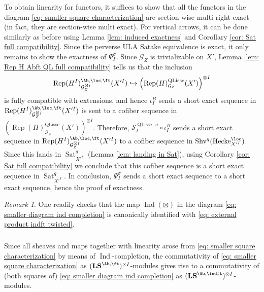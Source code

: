 \documentclass[10pt]{amsart}
\newcommand{\sssec}{\subsubsection}
\theoremstyle{remark}
\newtheorem{rmk}[subsubsection]{Remark}
\newcommand{\on}{\operatorname}
\newcommand{\cG}{\mathcal{G}}
\newcommand{\cS}{\mathcal{S}}
\newcommand{\Rep}{\on{Rep}}
\newcommand{\Shv}{\on{Shv}}
\newcommand{\QLisse}{\on{QLisse}}
\newcommand{\Sat}{\on{Sat}}
\DeclareMathOperator{\Ind}{Ind}
\newcommand{\Hecke}{\on{Hecke}}
\begin{document}
To obtain linearity for functors, it suffices to show that all the functors in the diagram \eqref{eq: smaller square characterization} are section-wise multi right-exact (in fact, they are section-wise multi exact). For vertical arrows, it can be done similarly as before using Lemma \ref{lem: induced exactness} and Corollary \ref{cor: Sat full compatibility}. Since the perverse ULA Satake equivalence is exact, it only remains to show the exactness of $\Psi^{\sigma}_I$. Since $\cG_Z$ is trivializable on $X'$, Lemma \ref{lem: Rep H Abft QL full compatibility} tells us that the inclusion
\[\Rep(H^I)^{\Ab,\loc,\ft}_{\cG^{\boxtimes I}_Z}(X'^I)\hookrightarrow \left(\Rep(H)^{\QLisse}_{\cG_Z}(X')\right)^{\otimes I}\]
is fully compatible with extensions, and hence $\iota^B_I$ sends a short exact sequence in $\Rep(H^I)^{\Ab,\loc,\ft}_{\cG^{\boxtimes I}_Z}(X'^I)$ is sent to a cofiber sequence in $\left(\Rep(H)^{\QLisse}_{\cG_Z}(X')\right)^{\otimes I}$. Therefore, $\cS^{\QLisse,\sigma}_I\circ \iota^B_I$ sends a short exact sequence in $\Rep(H^I)^{\Ab,\loc,\ft}_{\cG^{\boxtimes I}_Z}(X'^I)$ to a cofiber sequence in $\Shv^q(\Hecke^{\loc}_{X'^I})$. Since this lands in $\Sat^q_{X'^I}$ (Lemma \ref{lem: landing in Sat}), using Corollary \ref{cor: Sat full compatibility} we conclude that this cofiber sequence is a short exact sequence in $\Sat^q_{X'^I}$. In conclusion, $\Psi^{\sigma}_I$ sends a short exact sequence to a short exact sequence, hence the proof of exactness.

\begin{rmk}
    One readily checks that the map $\Ind(\boxtimes)$ in the diagram \eqref{eq: smaller diagram ind completion} is canonically identified with \eqref{eq: external product indft twisted}.
\end{rmk}

 \sssec{}
 Since all sheaves and maps together with linearity arose from \eqref{eq: smaller square characterization} by means of $\Ind$-completion, the commutativity of \eqref{eq: smaller square characterization} as $(\mathbf{LS}^{\Ab,\ft})^{\times I}$-modules gives rise to a commutativity of (both squares of) \eqref{eq: smaller diagram ind completion} as $(\mathbf{LS}^{\Ab,\indft})^{\otimes I}$-modules.
\end{document}
